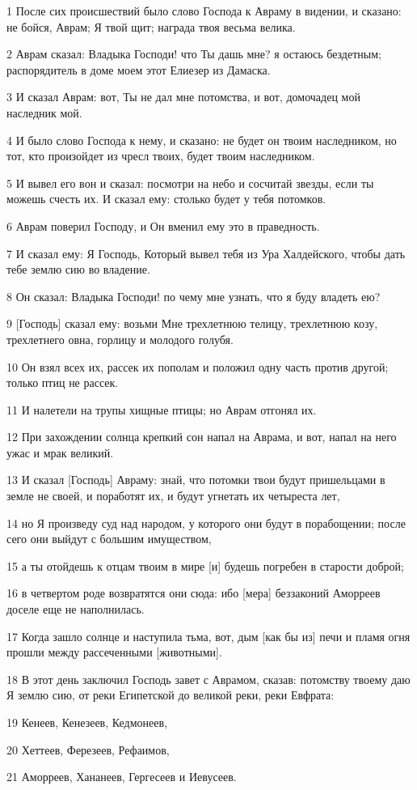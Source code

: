 \par 1 После сих происшествий было слово Господа к Авраму в видении, и сказано: не бойся, Аврам; Я твой щит; награда твоя весьма велика.
\par 2 Аврам сказал: Владыка Господи! что Ты дашь мне? я остаюсь бездетным; распорядитель в доме моем этот Елиезер из Дамаска.
\par 3 И сказал Аврам: вот, Ты не дал мне потомства, и вот, домочадец мой наследник мой.
\par 4 И было слово Господа к нему, и сказано: не будет он твоим наследником, но тот, кто произойдет из чресл твоих, будет твоим наследником.
\par 5 И вывел его вон и сказал: посмотри на небо и сосчитай звезды, если ты можешь счесть их. И сказал ему: столько будет у тебя потомков.
\par 6 Аврам поверил Господу, и Он вменил ему это в праведность.
\par 7 И сказал ему: Я Господь, Который вывел тебя из Ура Халдейского, чтобы дать тебе землю сию во владение.
\par 8 Он сказал: Владыка Господи! по чему мне узнать, что я буду владеть ею?
\par 9 [Господь] сказал ему: возьми Мне трехлетнюю телицу, трехлетнюю козу, трехлетнего овна, горлицу и молодого голубя.
\par 10 Он взял всех их, рассек их пополам и положил одну часть против другой; только птиц не рассек.
\par 11 И налетели на трупы хищные птицы; но Аврам отгонял их.
\par 12 При захождении солнца крепкий сон напал на Аврама, и вот, напал на него ужас и мрак великий.
\par 13 И сказал [Господь] Авраму: знай, что потомки твои будут пришельцами в земле не своей, и поработят их, и будут угнетать их четыреста лет,
\par 14 но Я произведу суд над народом, у которого они будут в порабощении; после сего они выйдут с большим имуществом,
\par 15 а ты отойдешь к отцам твоим в мире [и] будешь погребен в старости доброй;
\par 16 в четвертом роде возвратятся они сюда: ибо [мера] беззаконий Аморреев доселе еще не наполнилась.
\par 17 Когда зашло солнце и наступила тьма, вот, дым [как бы из] печи и пламя огня прошли между рассеченными [животными].
\par 18 В этот день заключил Господь завет с Аврамом, сказав: потомству твоему даю Я землю сию, от реки Египетской до великой реки, реки Евфрата:
\par 19 Кенеев, Кенезеев, Кедмонеев,
\par 20 Хеттеев, Ферезеев, Рефаимов,
\par 21 Аморреев, Хананеев, Гергесеев и Иевусеев.

